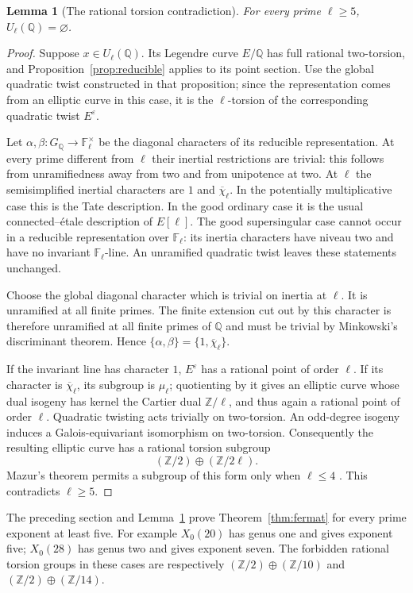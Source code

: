 \documentclass[11pt,a4paper]{article}
\newcommand{\Q}{\mathbb Q}
\newcommand{\Z}{\mathbb Z}
\newcommand{\F}{\mathbb F}
\newcommand{\eps}{\varepsilon}
\newcommand{\et}{\'et}
\theoremstyle{plain}
\newtheorem{lemma}[theorem]{Lemma}
\theoremstyle{definition}
\begin{document}
\begin{lemma}[The rational torsion contradiction]\label{lem:torsion}
For every prime $\ell\geq5$, $U_\ell(\Q)=\varnothing$.
\end{lemma}
\begin{proof}
Suppose $x\in U_\ell(\Q)$. Its Legendre curve $E/\Q$ has full
rational two-torsion, and Proposition~\ref{prop:reducible} applies
to its point section. Use the global quadratic twist constructed in
that proposition; since the representation comes from an elliptic
curve in this case, it is the $\ell$-torsion of the corresponding
quadratic twist $E^\eps$.

Let $\alpha,\beta:G_\Q\to\F_\ell^\times$ be the diagonal characters
of its reducible representation. At every prime different from
$\ell$ their inertial restrictions are trivial: this follows from
unramifiedness away from two and from unipotence at two. At $\ell$
the semisimplified inertial characters are $1$ and
$\overline\chi_\ell$. In the potentially multiplicative case this
is the Tate description. In the good ordinary case it is the usual
connected--\et ale description of $E[\ell]$. The good supersingular
case cannot occur in a reducible representation over $\F_\ell$:
its inertia characters have niveau two and have no invariant
$\F_\ell$-line. An unramified quadratic twist leaves these statements
unchanged.

Choose the global diagonal character which is trivial on inertia
at $\ell$. It is unramified at all finite primes. The finite
extension cut out by this character is therefore unramified at all
finite primes of $\Q$ and must be trivial by Minkowski's discriminant
theorem. Hence $\{\alpha,\beta\}=\{1,\overline\chi_\ell\}$.

If the invariant line has character $1$, $E^\eps$ has a rational
point of order $\ell$. If its character is
$\overline\chi_\ell$, its subgroup is $\mu_\ell$; quotienting by it
gives an elliptic curve whose dual isogeny has kernel the Cartier
dual $\Z/\ell$, and thus again a rational point of order $\ell$.
Quadratic twisting acts trivially on two-torsion. An odd-degree
isogeny induces a Galois-equivariant isomorphism on two-torsion.
Consequently the resulting elliptic curve has a rational torsion
subgroup
\[
 (\Z/2)\oplus(\Z/2\ell).
\]
Mazur's theorem permits a subgroup of this form only when
$\ell\leq4$ \citep[Theorem~(8), p.~35]{mazur}.
This contradicts $\ell\geq5$.
\end{proof}

The preceding section and Lemma~\ref{lem:torsion} prove
Theorem~\ref{thm:fermat} for every prime exponent at least five.
For example $X_0(20)$ has genus one and gives exponent five;
$X_0(28)$ has genus two and gives exponent seven. The forbidden
rational torsion groups in these cases are respectively
$(\Z/2)\oplus(\Z/10)$ and $(\Z/2)\oplus(\Z/14)$.
\end{document}
